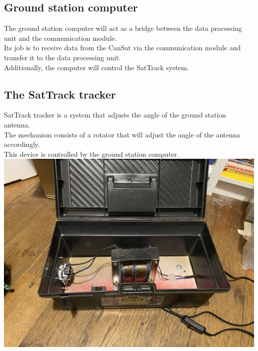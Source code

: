 \documentclass[class=report, crop=false]{standalone}
\begin{document}
\subsection*{Ground station computer}
The ground station computer will act as a bridge between the data processing unit and the communication module. \\
Its job is to receive data from the CanSat via the communication module and transfer it to the data processing unit. \\
Additionally, the computer will control the SatTrack system. \\
\subsection*{The SatTrack tracker}
SatTrack tracker is a system that adjusts the angle of the ground station antenna. \\
The mechanism consists of a rotator that will adjust the angle of the antenna accordingly. \\
This device is controlled by the ground station computer. \\
\includegraphics[width=\columnwidth]{ext/sattrackpower.png}
\end{document}
